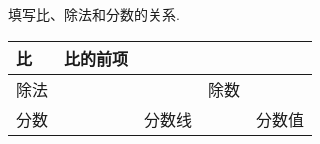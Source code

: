 填写比、除法和分数的关系.

\begin{center}

\begin{tabular}{|p{2.5cm}<{\centering}|p{2.5cm}<{\centering}|p{2.5cm}<{\centering}|p{2.5cm}<{\centering}|p{2.5cm}<{\centering}|}

     \hline

     比&比的前项&&& \\

     \hline

    除法&&&除数& \\

    \hline

    分数&&分数线&&分数值 \\

    \hline

\end{tabular}

\end{center}



